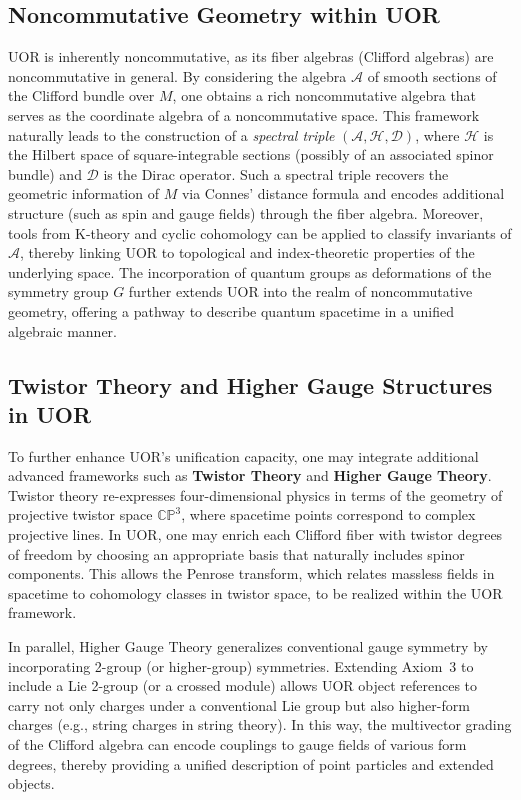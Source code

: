 \documentclass[12pt]{article}
\begin{document}
\subsection{Noncommutative Geometry within UOR}
UOR is inherently noncommutative, as its fiber algebras (Clifford algebras) are noncommutative in general. By considering the algebra $\mathcal{A}$ of smooth sections of the Clifford bundle over $M$, one obtains a rich noncommutative algebra that serves as the coordinate algebra of a noncommutative space. This framework naturally leads to the construction of a \emph{spectral triple} $(\mathcal{A},\mathcal{H},\mathcal{D})$, where $\mathcal{H}$ is the Hilbert space of square-integrable sections (possibly of an associated spinor bundle) and $\mathcal{D}$ is the Dirac operator. Such a spectral triple recovers the geometric information of $M$ via Connes' distance formula and encodes additional structure (such as spin and gauge fields) through the fiber algebra. Moreover, tools from K-theory and cyclic cohomology can be applied to classify invariants of $\mathcal{A}$, thereby linking UOR to topological and index-theoretic properties of the underlying space. The incorporation of quantum groups as deformations of the symmetry group $G$ further extends UOR into the realm of noncommutative geometry, offering a pathway to describe quantum spacetime in a unified algebraic manner.

\subsection{Twistor Theory and Higher Gauge Structures in UOR}
To further enhance UOR’s unification capacity, one may integrate additional advanced frameworks such as \textbf{Twistor Theory} and \textbf{Higher Gauge Theory}. Twistor theory re-expresses four-dimensional physics in terms of the geometry of projective twistor space $\mathbb{CP}^3$, where spacetime points correspond to complex projective lines. In UOR, one may enrich each Clifford fiber with twistor degrees of freedom by choosing an appropriate basis that naturally includes spinor components. This allows the Penrose transform, which relates massless fields in spacetime to cohomology classes in twistor space, to be realized within the UOR framework. 

In parallel, Higher Gauge Theory generalizes conventional gauge symmetry by incorporating 2-group (or higher-group) symmetries. Extending Axiom~3 to include a Lie 2-group (or a crossed module) allows UOR object references to carry not only charges under a conventional Lie group but also higher-form charges (e.g., string charges in string theory). In this way, the multivector grading of the Clifford algebra can encode couplings to gauge fields of various form degrees, thereby providing a unified description of point particles and extended objects.
\end{document}
